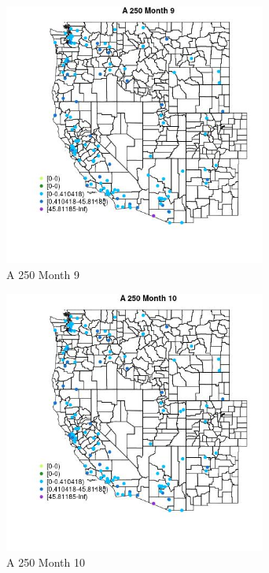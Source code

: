 \begin{figure} 
\centering  
\includegraphics[width=0.77\textwidth]{Code_Outputs/Report_ML_input_PM25_Step4_part_e_de_duplicated_aves_MapObsMo9A_250.jpg} 
\caption{\label{fig:Report_ML_input_PM25_Step4_part_e_de_duplicated_avesMapObsMo9A_250}A 250 Month 9} 
\end{figure} 
 

\begin{figure} 
\centering  
\includegraphics[width=0.77\textwidth]{Code_Outputs/Report_ML_input_PM25_Step4_part_e_de_duplicated_aves_MapObsMo10A_250.jpg} 
\caption{\label{fig:Report_ML_input_PM25_Step4_part_e_de_duplicated_avesMapObsMo10A_250}A 250 Month 10} 
\end{figure} 
 

